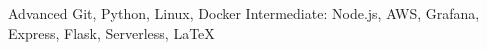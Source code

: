 

\begin{cvskills}

  \cvskill
    {Advanced} %
    {Git, Python, Linux, Docker} %
  \cvskill
    {Intermediate:} %
    {Node.js, AWS, Grafana, Express, Flask, Serverless, LaTeX} %

\end{cvskills}

